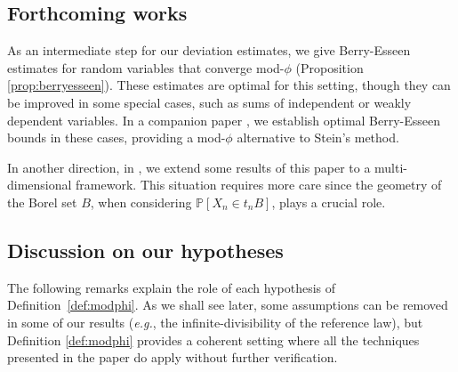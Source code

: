 \documentclass[12pt,a4paper,reqno]{amsart}
\theoremstyle{remark}
\newcommand{\R}{\mathbb{R}}
\begin{document}
\subsection{Forthcoming works}
As an intermediate step for our deviation estimates,
we give Berry-Esseen estimates for random variables 
that converge mod-$\phi$ (Proposition \ref{prop:berryesseen}).
These estimates are optimal for this setting,
though they can be improved in some special cases,
such as sums of independent or weakly dependent variables.
In a companion paper \cite{FMN14}, we establish optimal 
Berry-Esseen bounds in these cases,
providing a mod-$\phi$ alternative to Stein's method.
\medskip

In another direction, in \cite{Multidim},
we extend some results of this paper to a multi-dimensional framework.
This situation requires more care since the geometry of the Borel set $B$,
when considering $\mathbb P[X_n\in t_n B]$, plays a crucial role.
\bigskip

\subsection{Discussion on our hypotheses}
\label{subsec:discussion_hypotheses}
The following remarks explain the role of each hypothesis of Definition~\ref{def:modphi}. As we shall see later, some assumptions can be removed in some of our results (\emph{e.g.}, the infinite-divisibility of the reference law), but Definition \ref{def:modphi} provides a coherent setting where all the techniques presented in the paper do apply without further verification. 
\end{document}
